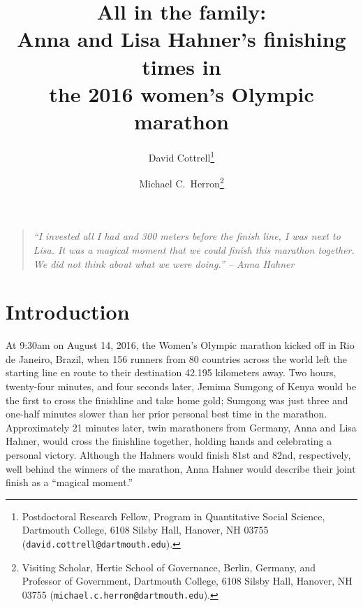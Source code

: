 \documentclass[12pt,titlepage]{article}
\begin{document}
\sloppy
\thispagestyle{empty}


\renewcommand{\topfraction}{.85}
\renewcommand{\bottomfraction}{.7}
\renewcommand{\textfraction}{.15}
\renewcommand{\floatpagefraction}{.66}
\renewcommand{\dbltopfraction}{.66}
\renewcommand{\dblfloatpagefraction}{.66}

\newcommand{\yi}{\ensuremath{Y_i}}



\title{\Large{All in the family:\\Anna and Lisa Hahner's finishing
    times in\\the 2016 women's Olympic
  marathon}}\author{David Cottrell\thanks{Postdoctoral Research
  Fellow, Program in Quantitative Social Science, Dartmouth College,
    6108 Silsby Hall, Hanover, NH
    03755 (\texttt{david.cottrell@dartmouth.edu}).} \and Michael C.\
  Herron\thanks{Visiting Scholar, Hertie School of Governance, Berlin,
    Germany, and Professor of Government, Dartmouth College, 6108
    Silsby Hall, Hanover, NH 03755
    (\texttt{michael.c.herron@dartmouth.edu}).}}


\maketitle \doublespacing 




\begin{quote}
  \emph{``I invested all I had and 300 meters before the finish line,
    I was next to Lisa. It was a magical moment that we could finish
    this marathon together. We did not think about what we were
    doing.'' -- Anna Hahner}
\end{quote}


\section*{Introduction}

At 9:30am on August 14, 2016, the Women's Olympic marathon kicked off
in Rio de Janeiro, Brazil, when 156 runners from 80 countries across
the world left the starting line en route to their destination 42.195
kilometers away. Two hours, twenty-four minutes, and four seconds
later, Jemima Sumgong of Kenya would be the first to cross the
finishline and take home gold; Sumgong was just three and one-half
minutes slower than her prior personal best time in the
marathon. Approximately 21 minutes later, twin marathoners from
Germany, Anna and Lisa Hahner, would cross the finishline together,
holding hands and celebrating a personal victory. Although the Hahners
would finish 81st and 82nd, respectively, well behind the winners of
the marathon, Anna Hahner would describe their joint finish as a
``magical moment.''
\end{document}

